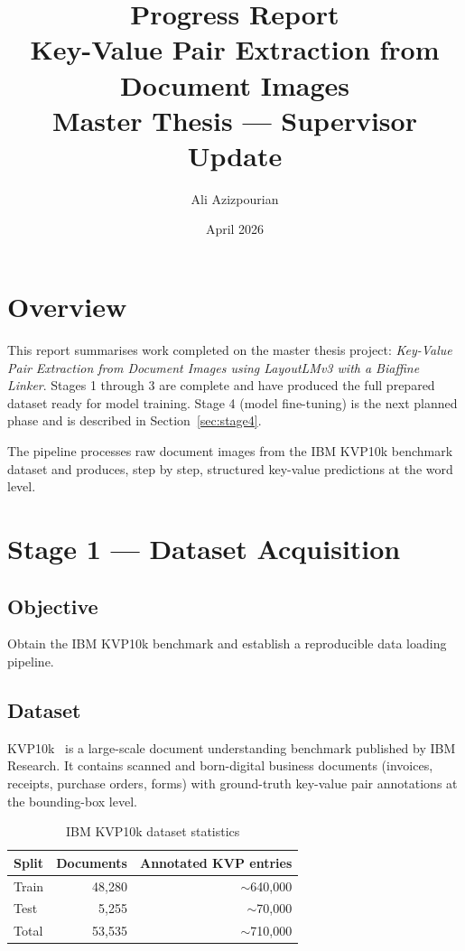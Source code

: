 \documentclass[11pt,a4paper]{article}
\title{\textbf{Progress Report}\\[0.4em]
       \large Key-Value Pair Extraction from Document Images\\[0.2em]
       \normalsize Master Thesis --- Supervisor Update}
\author{Ali Azizpourian}
\date{April 2026}
\begin{document}
\maketitle
\thispagestyle{fancy}

\section*{Overview}

This report summarises work completed on the master thesis project:
\textit{Key-Value Pair Extraction from Document Images using LayoutLMv3 with a
Biaffine Linker}.
Stages 1 through 3 are complete and have produced the full prepared dataset
ready for model training.
Stage 4 (model fine-tuning) is the next planned phase and is described in
Section~\ref{sec:stage4}.

The pipeline processes raw document images from the IBM KVP10k benchmark
dataset and produces, step by step, structured key-value predictions at the
word level.

\section{Stage 1 --- Dataset Acquisition}

\subsection*{Objective}
Obtain the IBM KVP10k benchmark and establish a reproducible data loading
pipeline.

\subsection*{Dataset}
KVP10k~\cite{kvp10k} is a large-scale document understanding benchmark
published by IBM Research. It contains scanned and born-digital business
documents (invoices, receipts, purchase orders, forms) with ground-truth
key-value pair annotations at the bounding-box level.

\begin{table}[h!]
  \centering
  \caption{IBM KVP10k dataset statistics}
  \label{tab:dataset}
  \begin{tabular}{lrr}
    \toprule
    \textbf{Split} & \textbf{Documents} & \textbf{Annotated KVP entries} \\
    \midrule
    Train          & 48{,}280           & $\sim$640{,}000 \\
    Test           & 5{,}255            & $\sim$70{,}000 \\
    \midrule
    Total          & 53{,}535           & $\sim$710{,}000 \\
    \bottomrule
  \end{tabular}
\end{table}
\end{document}
